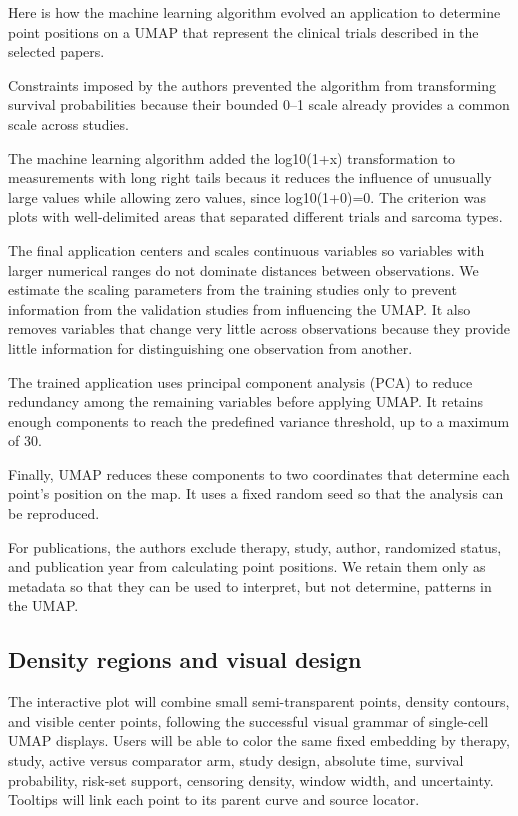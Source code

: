 \documentclass[17pt]{extarticle}
\begin{document}
Here is how the machine learning algorithm evolved an application to determine point positions on a UMAP that represent the clinical trials described in the selected papers.

Constraints imposed by the authors prevented the algorithm from transforming survival probabilities because their bounded 0–1 scale already provides a common scale across studies.

The machine learning algorithm added the log10(1+x) transformation to measurements with long right tails becaus it reduces the influence of unusually large values while allowing zero values, since log10(1+0)=0. The criterion was plots with well-delimited areas that separated different trials and sarcoma types.


The final application centers and scales continuous variables so variables with larger numerical ranges do not dominate distances between observations. We estimate the scaling parameters from the training studies only to prevent information from the validation studies from influencing the UMAP.
It also removes variables that change very little across observations because they provide little information for distinguishing one observation from another.

The trained application uses principal component analysis (PCA) to reduce redundancy among the remaining variables before applying UMAP. It retains enough components to reach the predefined variance threshold, up to a maximum of 30.

Finally, UMAP reduces these components to two coordinates that determine each point's position on the map. It uses a fixed random seed so that the analysis can be reproduced.

For publications, the authors exclude therapy, study, author, randomized status, and publication year from calculating point positions. We retain them only as metadata so that they can be used to interpret, but not determine, patterns in the UMAP.


\subsection{Density regions and visual design}

The interactive plot will combine small semi-transparent points, density contours, and visible center points, following the successful visual grammar of single-cell UMAP displays. Users will be able to color the same fixed embedding by therapy, study, active versus comparator arm, study design, absolute time, survival probability, risk-set support, censoring density, window width, and uncertainty. Tooltips will link each point to its parent curve and source locator.
\end{document}
